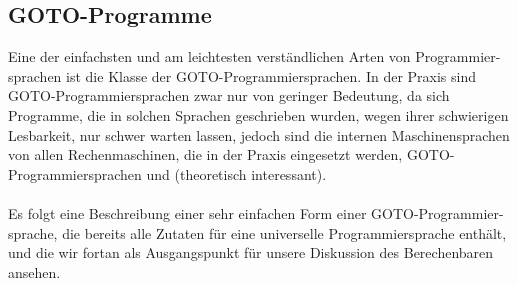 \documentclass[11pt,a4paper,leqno]{report}
\numberwithin{equation}{chapter}
\begin{document}
\newpage
\subsection{GOTO-Programme}
Eine der einfachsten und am leichtesten verständlichen Arten von Programmier- sprachen ist die Klasse der GOTO-Programmiersprachen. In der Praxis sind GOTO-Programmiersprachen zwar nur von geringer Bedeutung, da sich Programme, die in solchen Sprachen geschrieben wurden, wegen ihrer schwierigen Lesbarkeit, nur schwer warten lassen, jedoch sind die internen Maschinensprachen von allen Rechenmaschinen, die in der Praxis eingesetzt werden, GOTO-Programmiersprachen und (theoretisch interessant).\\
\\
Es folgt eine Beschreibung einer sehr einfachen Form einer GOTO-Programmier- sprache, die bereits alle Zutaten für eine universelle Programmiersprache enthält, und die wir fortan als Ausgangspunkt für unsere Diskussion des Berechenbaren ansehen.
\end{document}
